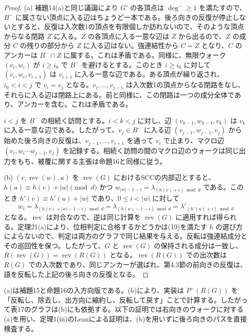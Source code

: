 \documentclass[11pt,reqno]{amsart}
\theoremstyle{definition}
\theoremstyle{definition}
\theoremstyle{remark}
\begin{document}
\begin{proof}\leavevmode\label{proof:75}
(a) 補題14(a)と同じ議論により \(G'\) の各頂点は \(\deg^-\ge1\) を満たすので、\(B^-\) に属さない頂点に入る辺はちょうど一本である。後ろ向きの反復が停止しないとすると、反復は入次数1の頂点を有限個しか訪れないので、そのような頂点からなる閉路 \(Z\) に入る。\(Z\) の各頂点に入る一意な辺は \(Z\) から出るので、\(Z\) の成分 \(C\) の残りの部分から \(Z\) に入る辺はない。強連結性から \(C=Z\) となり、\(C\) のアンカーは \(B^-\cap Z\) に属する。これは矛盾である。同様に、無限ウォーク \((v_i,w_i)\) が \(i\ge i_0\) で \(B^-\) を避けるとする。このとき \(i\ge i_0\) に対して \((v_i,w_i,v_{i+1})\) は \(v_{i+1}\) に入る一意な辺である。ある頂点が繰り返され、\(i_0<i<j\) で \(v_i=v_j\) となる。\(v_i,\ldots,v_{j-1}\) は入次数1の頂点からなる閉路をなし、それらに入る辺は閉路上にある。前と同様に、この閉路は一つの成分全体であり、アンカーを含む。これは矛盾である。

\(i<j\) を \(B^-\) の相続く訪問とする。\(i<k<j\) に対し、辺 \((v_{k-1},w_{k-1},v_k)\) は \(v_k\) に入る一意な辺である。したがって、\(v_j\in B^-\) に入る辺 \((v_{j-1},w_{j-1},v_j)\) から始めた後ろ向きの反復は、\(v_{j-1},\ldots,v_{i+1}\) を通って \(v_i\) で止まり、マクロ辺 \((v_i,w_i\cdots w_{j-1},v_j)\) を記録する。相続く訪問の間のマクロ辺のウォークは同じ出力をもち、被覆に関する主張は命題16と同様に従う。

(b) \((v,\operatorname{rev}(w),u)\) を \(\operatorname{rev}(G)\) におけるSCCの内部辺とすると、\(h(u)\equiv h(v)+|w|\pmod d\) かつ \(w_{|w|-1-i}=\lambda_{(h(v)+i)\bmod d}\) である。このとき \(h'(v)\equiv h'(u)+|w|\) であり、\(0\le i<|w|\) に対して
\[
w_i=\lambda_{(h(v)+|w|-1-i)\bmod d}=\lambda_{(h(u)-1-i)\bmod d}
=\lambda'_{(h'(u)+i)\bmod d}
\]
となる。\(\operatorname{rev}\) は対合なので、逆は同じ計算を \(\operatorname{rev}(G)\) に適用すれば得られる。定理21(a)により、位相判定に合格するかどうかは(19)を満たす \(h\) の選び方によらないので、判定は両方のグラフで同じ結果を与える。反転は強連結成分とその巡回性を保つ。したがって、\(G\) と \(\operatorname{rev}(G)\) の保持される成分は一致し、\(R(\operatorname{rev}(G))=\operatorname{rev}(R(G))\) となる。\(\operatorname{rev}(R(G))\) での出次数は \(R(G)\) での入次数であり、同じアンカーが選ばれ、第4.3節の前向きの反復は、語を反転した上記の後ろ向きの反復となる。\qedhere
\end{proof}

(a)は補題15と命題16の入方向版である。(b)により、実装は \(P^-(R(G))\) を「反転し、除去し、出方向に縮約し、反転して戻す」ことで計算する。したがって表17のグラフは(b)にも依拠する。以下の証明では右向きのウォークに対する(a)を用い、定理1(iii)のLeanによる証明は、(b)を用いずに後ろ向きのパスを直接検査する。
\end{document}
